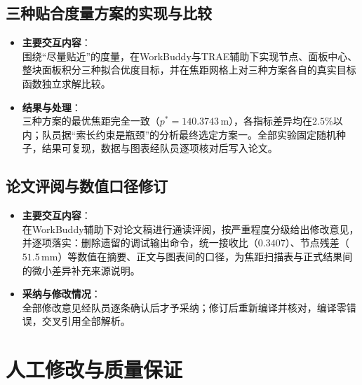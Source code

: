 \documentclass[12pt,a4paper]{article}
\begin{document}
\subsection{三种贴合度量方案的实现与比较}

\begin{itemize}
    \item \textbf{主要交互内容}：\\
    围绕``尽量贴近''的度量，在WorkBuddy与TRAE辅助下实现节点、面板中心、整块面板积分三种拟合优度目标，并在焦距网格上对三种方案各自的真实目标函数独立求解比较。

    \item \textbf{结果与处理}：\\
    三种方案的最优焦距完全一致（$p^{*}=140.3743\,\mathrm{m}$），各指标差异均在$2.5\%$以内；队员据``索长约束是瓶颈''的分析最终选定方案一。全部实验固定随机种子，结果可复现，数据与图表经队员逐项核对后写入论文。
\end{itemize}

\subsection{论文评阅与数值口径修订}

\begin{itemize}
    \item \textbf{主要交互内容}：\\
    在WorkBuddy辅助下对论文稿进行通读评阅，按严重程度分级给出修改意见，并逐项落实：删除遗留的调试输出命令，统一接收比（$0.3407$）、节点残差（$51.5\,\mathrm{mm}$）等数值在摘要、正文与图表间的口径，为焦距扫描表与正式结果间的微小差异补充来源说明。

    \item \textbf{采纳与修改情况}：\\
    全部修改意见经队员逐条确认后才予采纳；修订后重新编译并核对，编译零错误，交叉引用全部解析。
\end{itemize}

\section{人工修改与质量保证}
\end{document}
